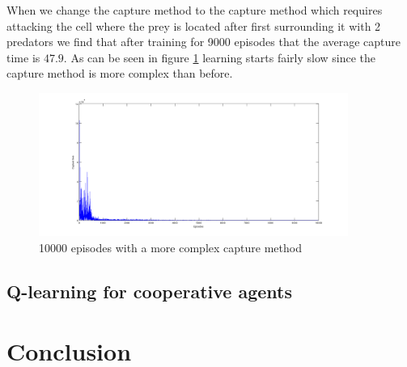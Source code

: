 \documentclass[10pt]{article}
\begin{document}
When we change the capture method to the capture method which requires attacking the cell where the prey is located after first surrounding it with 2 predators we find that after training for 9000 episodes that the average capture time is $47.9$. As can be seen in figure \ref{cap4} learning starts fairly slow since the capture method is more complex than before.

\begin{figure}[h!tb]
\centering
\includegraphics[width=0.9\textwidth]{img/cap4_ind}
\caption{10000 episodes with a more complex capture method}
\label{cap4}
\end{figure}

\subsection{Q-learning for cooperative agents}



\section{Conclusion}\label{conclusion}





% 
%   
%  
\end{document}
